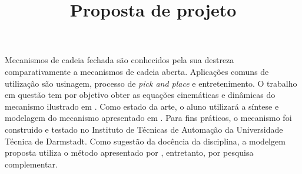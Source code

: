 \documentclass[]{article}
\title{Proposta de projeto}
\author{\studentname \qquad \uspid \qquad \uspmail}
\begin{document}
\maketitle

Mecanismos de cadeia fechada são conhecidos pela sua destreza comparativamente a mecanismos de cadeia aberta. Aplicações comuns de utilização são usinagem, processo de \emph{pick and place} e entretenimento. O trabalho em questão tem por objetivo obter as equações cinemáticas e dinâmicas do mecanismo ilustrado em \autocite{deskriptor2014}. Como estado da arte, o aluno utilizará a síntese e modelagem do mecanismo apresentado em \autocite{tubiblio52241}. Para fins práticos, o mecanismo foi construido e testado no Instituto de Técnicas de Automação da Universidade Técnica de Darmstadt. Como sugestão da docência da disciplina, a modelgem proposta utiliza o método apresentado por \autocite{udwadia_kalaba_1996}, entretanto, por pesquisa complementar.

\printbibliography 
\end{document}
